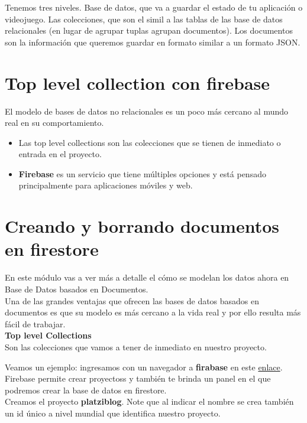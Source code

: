 \documentclass{article}
\begin{document}
Tenemos tres niveles. Base de datos, que va a guardar el estado de tu
aplicación o videojuego. Las colecciones, que son el simil a las tablas de las
base de datos relacionales (en lugar de agrupar tuplas agrupan documentos). Los
documentos son la información que queremos guardar en formato similar a un
formato JSON.

\section{Top level collection con firebase}%
El modelo de bases de datos no relacionales es un poco más cercano al mundo
real en su comportamiento.\\
\begin{itemize}
  \item Las top level collections son las colecciones que se tienen de
    inmediato o entrada en el proyecto.
  \item \textbf{Firebase} es un servicio que tiene múltiples opciones y está
    pensado principalmente para aplicaciones móviles y web.
\end{itemize}

\section{Creando y borrando documentos en firestore}%
En este módulo vas a ver más a detalle el cómo se modelan los datos ahora en
Base de Datos basados en Documentos.\\

Una de las grandes ventajas que ofrecen las bases de datos basados en
documentos es que su modelo es más cercano a la vida real y por ello resulta
más fácil de trabajar.\\

\textbf{Top level Collections}\\
Son las colecciones que vamos a tener de inmediato en nuestro proyecto.

Veamos un ejemplo: ingresamos con un navegador a \textbf{firabase} en este
\href{https://console.firebase.google.com/}{enlace}. Firebase permite crear
proyectoss y también te brinda un panel en el que podremos crear la base de
datos en firestore.\\

Creamos el proyecto \textbf{platziblog}. Note que al indicar el nombre se crea
también un id único a nivel mundial que identifica nuestro proyecto.\\
\end{document}
